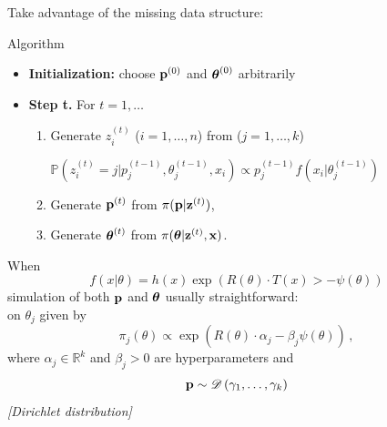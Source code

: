 \begin{slide}
Take advantage of the missing data structure:\\

\begin{block}{Algorithm}
{\sffamily
\begin{itemize}
\item  
	{\bfseries Initialization:} 
		 choose $\mathbf{p}^{(0)}$ and $\mbox{\boldmath{$\theta$}}^{(0)}$ arbitrarily
\item  {\bfseries Step t.} For $t=1,\ldots$
\begin{enumerate}
\item Generate $z_i^{(t)}$ ($i=1,\ldots,n$) from ($j=1,\ldots,k$)
                 \begin{center}
                 $\mathbb{P}\left(z_i^{(t)}=j|p_j^{(t-1)},\theta_j^{(t-1)},x_i\right)\propto 
                 p_j^{(t-1)}f\left(x_i|\theta_j^{(t-1)}\right)$
                 \end{center}
\item Generate $\mathbf{p}^{(t)}$ from $\pi(\mathbf{p}|{\bf z}^{(t)})$, 
\item Generate $\mbox{\boldmath{$\theta$}}^{(t)}$ from $\pi(\mbox{\boldmath{$\theta$}}|{\bf z}^{(t)},\mathbf{x})$.
\end{enumerate}
\end{itemize}
}
\end{block}

\end{slide}\begin{slide}
When
$$
f(x|\theta)=h(x)\exp(R(\theta)\cdot T(x)>-\psi(\theta))
$$
simulation of both $\mathbf{p}$ and $\mbox{\boldmath{$\theta$}}$
usually straightforward:\\

 on $\theta_j$ given by\hyperlink{conju}{}
$$
\pi_j(\theta)\propto \exp(R(\theta)\cdot \alpha_j-\beta_j\psi(\theta))\,,
$$
where $\alpha_j\in\mathbb{R}^k$ and $\beta_j>0$ are hyperparameters and
$$
\mathbf{p}\sim\mathscr{D}\left(\gamma_1,\ldots,\gamma_k\right)
$$
{\em [Dirichlet distribution]}

\end{slide}\begin{slide}


\end{slide}
